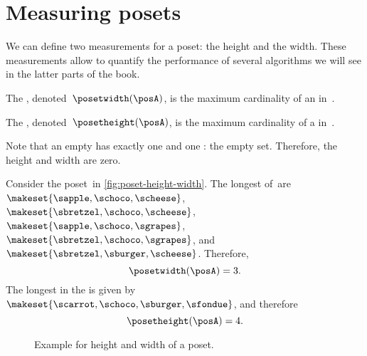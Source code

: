 
\section{Measuring posets}
We can define two measurements for a poset: the height and the width.
These measurements allow to quantify the performance of several algorithms we will see in the latter parts of the book.
\begin{definition}
    \label{def:poset-width}
    The , denoted~$\posetwidth(\posA)$, is the maximum cardinality of an  in~\posA.
\end{definition}

\begin{definition}
    \label{def:poset-height}
    The , denoted~$\posetheight(\posA)$, is the maximum cardinality of a  in~\posA.
\end{definition}

Note that an empty  has exactly one  and one : the empty set.
Therefore, the height and width are zero.

\begin{example}
    Consider the poset~\posA in \cref{fig:poset-height-width}.
    The longest  of~\posA are~$\makeset{\sapple, \schoco, \scheese}$, $\makeset{\sbretzel, \schoco, \scheese}$, $\makeset{\sapple, \schoco, \sgrapes}$, $\makeset{\sbretzel, \schoco, \sgrapes}$, and~$\makeset{\sbretzel, \sburger, \scheese}$.
    Therefore,
    \begin{equation}\label{eq:poset-height-width-1}
        \posetwidth(\posA)=3.
    \end{equation}
    The longest  in the  is given by~$\makeset{\scarrot,\schoco,\sburger,\sfondue}$, and therefore
    \begin{equation}\label{eq:poset-height-width-2}
        \posetheight(\posA)=4.
    \end{equation}
\end{example}

\begin{figure*}[h]
    \caption{Example for height and width of a poset.
    }
\end{figure*}


